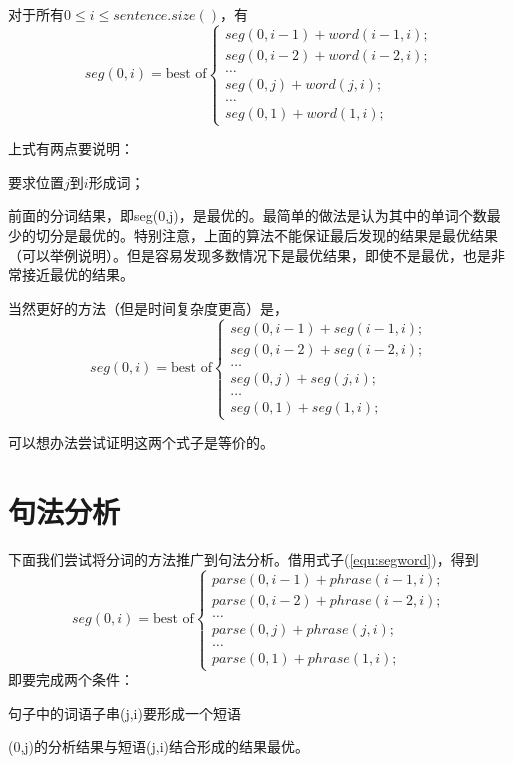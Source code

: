 \documentclass{article}
\begin{document}
\begin{CJK}{UTF8}{gbsn}
对于所有$0 \le i\le sentence.size()$，有
\begin{equation}
seg(0,i)=\text{best of} \left\{
\begin{array}{l}
  seg(0,i-1)+word(i-1,i); \\
  seg(0,i-2)+word(i-2,i); \\
  \ldots \\
  seg(0,j)+word(j,i); \\
  \ldots \\
  seg(0,1) + word(1,i);
\end{array}
\right. \label{equ:segword}
\end{equation}

上式有两点要说明：
\begin{itemize*}
\item 要求位置$j$到$i$形成词；
\item 前面的分词结果，即seg(0,j)，是最优的。最简单的做法是认为其中的单词个数最少的切分是最优的。特别注意，上面的算法不能保证最后发现的结果是最优结果（可以举例说明）。但是容易发现多数情况下是最优结果，即使不是最优，也是非常接近最优的结果。
\end{itemize*}

当然更好的方法（但是时间复杂度更高）是，
\begin{equation}
seg(0,i)=\text{best of} \left\{
\begin{array}{l}
  seg(0,i-1)+seg(i-1,i); \\
  seg(0,i-2)+seg(i-2,i); \\
  \ldots \\
  seg(0,j)+seg(j,i); \\
  \ldots \\
  seg(0,1) + seg(1,i);
\end{array}
\right. \label{equ:segseg}
\end{equation}

可以想办法尝试证明这两个式子是等价的。

\section{句法分析}

下面我们尝试将分词的方法推广到句法分析。借用式子(\ref{equ:segword})，得到
\begin{equation}
seg(0,i)=\text{best of} \left\{
\begin{array}{l}
  parse(0,i-1)+phrase(i-1,i); \\
  parse(0,i-2)+phrase(i-2,i); \\
  \ldots \\
  parse(0,j)+phrase(j,i); \\
  \ldots \\
  parse(0,1) + phrase(1,i);
\end{array}
\right. \label{equ:parsephrase}
\end{equation}
即要完成两个条件：
\begin{itemize*}
\item 句子中的词语子串(j,i)要形成一个短语
\item (0,j)的分析结果与短语(j,i)结合形成的结果最优。
\end{itemize*}


\end{CJK}
\end{document}
